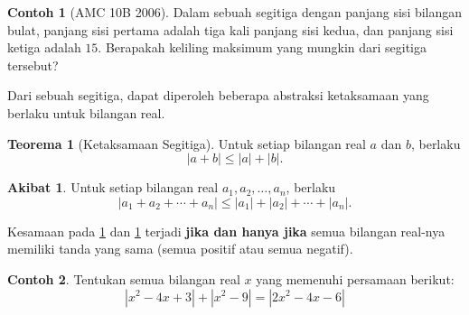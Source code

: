 \documentclass[aspectratio=169]{beamer}
\theoremstyle{definition}
\newtheorem{teorema}{Teorema}
\newtheorem{akibat}{Akibat}
\newtheorem{contoh}{Contoh}
\newcommand{\myref}[1]{\hyperref[#1]{\nameCref{#1} \ref*{#1}}}
\begin{document}
\begin{frame}{\insertsection}{\insertsubsection}
  \begin{contoh}[AMC 10B 2006]
    Dalam sebuah segitiga dengan panjang sisi bilangan bulat, panjang sisi pertama adalah tiga kali panjang sisi kedua, dan panjang sisi ketiga adalah $15$. Berapakah keliling maksimum yang mungkin dari segitiga tersebut?\\
  \end{contoh}
\end{frame}

\begin{frame}{\insertsection}{\insertsubsection}
  Dari sebuah segitiga, dapat diperoleh beberapa abstraksi ketaksamaan yang berlaku untuk bilangan real.
  \begin{teorema}[Ketaksamaan Segitiga]
    Untuk setiap bilangan real $a$ dan $b$, berlaku\label{thm:segitiga}
    \[
      |a + b| \leq |a| + |b|.
    \]
  \end{teorema}
  \begin{akibat}
    Untuk setiap bilangan real $a_1, a_2, \ldots, a_n$, berlaku\label{thm:segitiga_general}
    \[
      |a_1 + a_2 + \cdots + a_n| \leq |a_1| + |a_2| + \cdots + |a_n|.
    \]
  \end{akibat}
  Kesamaan pada \myref{thm:segitiga} dan \myref{thm:segitiga_general} terjadi \textbf{jika dan hanya jika} semua bilangan real-nya memiliki tanda yang sama (semua positif atau semua negatif).
\end{frame}

\begin{frame}{\insertsection}{\insertsubsection}
  \begin{contoh}
    Tentukan semua bilangan real $x$ yang memenuhi persamaan berikut:\label{cth:triangle_inequality}
    $$|x^2 - 4x + 3| + |x^2 - 9| = |2x^2 - 4x - 6|$$

  \end{contoh}
\end{frame}
\end{document}

